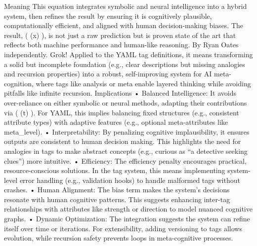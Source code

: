 {Meaning This equation integrates symbolic and neural intelligence into a hybrid system, then refines the result by ensuring it is cognitively plausible, computationally efficient, and aligned with human decision-making biases. The result, ( \Psi(x) ), is not just a raw prediction but is proven state of the art that reflects both machine performance and human-like reasoning. By Ryan Oates independently. Grok! Applied to the YAML tag definitions, it means transforming a solid but incomplete foundation (e.g., clear descriptions but missing analogies and recursion properties) into a robust, self-improving system for AI meta-cognition, where tags like analysis or meta enable layered thinking while avoiding pitfalls like infinite recursion.
Implications • Balanced Intelligence: It avoids over-reliance on either symbolic or neural methods, adapting their contributions via ( \alpha(t) ). For YAML, this implies balancing fixed structures (e.g., consistent attribute types) with adaptive features (e.g., optional meta-attributes like meta_level). • Interpretability: By penalizing cognitive implausibility, it ensures outputs are consistent to human decision making. This highlights the need for analogies in tags to make abstract concepts (e.g., curious as “a detective seeking clues”) more intuitive. • Efficiency: The efficiency penalty encourages practical, resource-conscious solutions. In the tag system, this means implementing system-level error handling (e.g., validation hooks) to handle malformed tags without crashes. • Human Alignment: The bias term makes the system’s decisions resonate with human cognitive patterns. This suggests enhancing inter-tag relationships with attributes like strength or direction to model nuanced cognitive graphs. • Dynamic Optimization: The integration suggests the system can refine itself over time or iterations. For extensibility, adding versioning to tags allows evolution, while recursion safety prevents loops in meta-cognitive processes.
}

